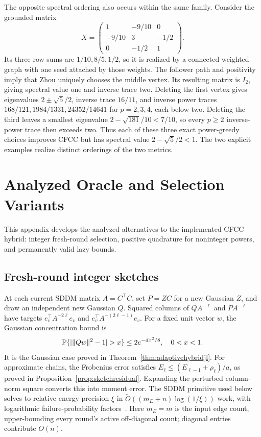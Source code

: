 The opposite spectral ordering also occurs within the same family.
Consider the grounded matrix
\[
 X=\begin{pmatrix}1&-9/10&0\\-9/10&3&-1/2\\0&-1/2&1\end{pmatrix}.
\]
Its three row sums are $1/10,8/5,1/2$, so it is realized by a
connected weighted graph with one seed attached by those weights.
The follower path and positivity imply that Zhou uniquely chooses
the middle vertex. Its resulting matrix is $I_2$, giving spectral
value one and inverse trace two. Deleting the first vertex gives
eigenvalues $2\pm\sqrt5/2$, inverse trace $16/11$, and inverse
power traces $168/121,1984/1331,24352/14641$ for $p=2,3,4$,
each below two. Deleting the third leaves a smallest eigenvalue
$2-\sqrt{181}/10<7/10$, so every $p\geq2$ inverse-power trace
then exceeds two. Thus each of these three exact power-greedy
choices improves CFCC but has spectral value $2-\sqrt5/2<1$.
The two explicit examples realize distinct orderings of the two metrics.



\section{Analyzed Oracle and Selection Variants}\label{app:variants}

This appendix develops the analyzed alternatives to the implemented
CFCC hybrid: integer fresh-round selection, positive quadrature for
noninteger powers, and permanently valid lazy bounds.

\subsection{Fresh-round integer sketches}
At each current SDDM matrix $A=C^\top C$, set $P=ZC$ for a new
Gaussian $Z$, and draw an independent new Gaussian $Q$.
Squared columns of $QA^{-\ell}$ and $PA^{-\ell}$ have targets
$e_v^\top A^{-2\ell}e_v$ and $e_v^\top A^{-(2\ell-1)}e_v$.
For a fixed unit vector $w$, the Gaussian concentration bound is
\begin{equation}\label{eq:chisquare}
\Prob\{|\|Qw\|^2-1|>x\}\leq2e^{-dx^2/8},\quad 0<x<1.
\end{equation}
It is the Gaussian case proved in Theorem~\ref{thm:adaptivehybridjl}.
For approximate chains, the Frobenius error satisfies
$E_\ell\leq(E_{\ell-1}+\rho_\ell)/a$, as proved in
Proposition~\ref{prop:sketchresidual}. Expanding the perturbed
column-norm square converts this into moment error.
The SDDM primitive used below solves to relative energy precision
$\xi$ in $\widetilde O((m_E+n)\log(1/\xi))$ work, with
logarithmic failure-probability factors~\cite{spielman2014}.
Here $m_E=m$ is the input edge count, upper-bounding every round's
active off-diagonal count; diagonal entries contribute $O(n)$.
